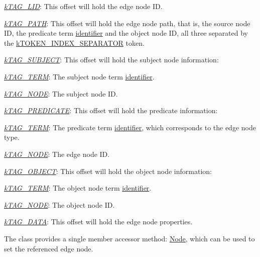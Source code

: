 \begin{DoxyItemize}
\item {\itshape \hyperlink{}{k\-T\-A\-G\-\_\-\-L\-I\-D}}\-: This offset will hold the edge node I\-D. 
\item {\itshape \hyperlink{}{k\-T\-A\-G\-\_\-\-P\-A\-T\-H}}\-: This offset will hold the edge node path, that is, the source node I\-D, the predicate term \hyperlink{}{identifier} and the object node I\-D, all three separated by the \hyperlink{}{k\-T\-O\-K\-E\-N\-\_\-\-I\-N\-D\-E\-X\-\_\-\-S\-E\-P\-A\-R\-A\-T\-O\-R} token. 
\item {\itshape \hyperlink{}{k\-T\-A\-G\-\_\-\-S\-U\-B\-J\-E\-C\-T}}\-: This offset will hold the subject node information\-: 
\begin{DoxyItemize}
\item {\itshape \hyperlink{}{k\-T\-A\-G\-\_\-\-T\-E\-R\-M}}\-: The subject node term \hyperlink{}{identifier}. 
\item {\itshape \hyperlink{}{k\-T\-A\-G\-\_\-\-N\-O\-D\-E}}\-: The subject node I\-D. 
\end{DoxyItemize}
\item {\itshape \hyperlink{}{k\-T\-A\-G\-\_\-\-P\-R\-E\-D\-I\-C\-A\-T\-E}}\-: This offset will hold the predicate information\-: 
\begin{DoxyItemize}
\item {\itshape \hyperlink{}{k\-T\-A\-G\-\_\-\-T\-E\-R\-M}}\-: The predicate term \hyperlink{}{identifier}, which corresponds to the edge node type. 
\item {\itshape \hyperlink{}{k\-T\-A\-G\-\_\-\-N\-O\-D\-E}}\-: The edge node I\-D. 
\end{DoxyItemize}
\item {\itshape \hyperlink{}{k\-T\-A\-G\-\_\-\-O\-B\-J\-E\-C\-T}}\-: This offset will hold the object node information\-: 
\begin{DoxyItemize}
\item {\itshape \hyperlink{}{k\-T\-A\-G\-\_\-\-T\-E\-R\-M}}\-: The object node term \hyperlink{}{identifier}. 
\item {\itshape \hyperlink{}{k\-T\-A\-G\-\_\-\-N\-O\-D\-E}}\-: The object node I\-D. 
\end{DoxyItemize}
\item {\itshape \hyperlink{}{k\-T\-A\-G\-\_\-\-D\-A\-T\-A}}\-: This offset will hold the edge node properties. 
\end{DoxyItemize}

The class provides a single member accessor method\-: \hyperlink{}{Node}, which can be used to set the referenced edge node.

